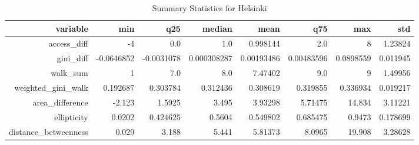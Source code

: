 \begin{table}
  \caption{Summary Statistics for Helsinki}
  \begin{tabular}{rrrrrrrr}
    \hline
    \textbf{variable} & \textbf{min} & \textbf{q25} & \textbf{median} & \textbf{mean} & \textbf{q75} & \textbf{max} & \textbf{std} \\\hline
    access\_diff & -4 & 0.0 & 1.0 & 0.998144 & 2.0 & 8 & 1.23824 \\
    gini\_diff & -0.0646852 & -0.0031078 & 0.000308287 & 0.00193486 & 0.00483596 & 0.0898559 & 0.011945 \\
    walk\_sum & 1 & 7.0 & 8.0 & 7.47402 & 9.0 & 9 & 1.49956 \\
    weighted\_gini\_walk & 0.192687 & 0.303784 & 0.312436 & 0.308619 & 0.319855 & 0.336934 & 0.019217 \\
    area\_difference & -2.123 & 1.5925 & 3.495 & 3.93298 & 5.71475 & 14.834 & 3.11221 \\
    ellipticity & 0.0202 & 0.424625 & 0.5604 & 0.549802 & 0.685475 & 0.9473 & 0.178699 \\
    distance\_betweenness & 0.029 & 3.188 & 5.441 & 5.81373 & 8.0965 & 19.908 & 3.28628 \\\hline
  \end{tabular}
  \label{tab:helsinki_stats}
\end{table}
